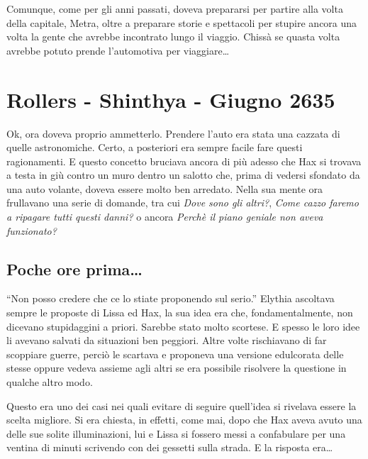     Comunque, come per gli anni passati, doveva prepararsi per partire alla
    volta della capitale, Metra, oltre a preparare storie e spettacoli per
    stupire ancora una volta la gente che avrebbe incontrato lungo il
    viaggio. Chissà se quasta volta avrebbe potuto prende l'automotiva per
    viaggiare\dots{}

    \section{Rollers - Shinthya - Giugno 2635}
    Ok, ora doveva proprio ammetterlo. Prendere l'auto era stata una
    cazzata di quelle astronomiche. Certo, a posteriori era sempre facile
    fare questi ragionamenti. E questo concetto bruciava ancora di più
    adesso che Hax si trovava a testa in giù contro un muro dentro un
    salotto che, prima di vedersi sfondato da una auto volante, doveva
    essere molto ben arredato. Nella sua mente ora frullavano una serie di
    domande, tra cui \emph{Dove sono gli altri?}, \emph{Come cazzo faremo
    a ripagare tutti questi danni?} o ancora \emph{Perchè il piano geniale
    non aveva funzionato?}

    \subsection{Poche ore prima\dots{}}
    ``Non posso credere che ce lo stiate proponendo sul serio.'' Elythia
    ascoltava sempre le proposte di Lissa ed Hax, la sua idea era che,
    fondamentalmente, non dicevano stupidaggini a priori. Sarebbe stato
    molto scortese. E spesso le loro idee li avevano salvati da situazioni
    ben peggiori. Altre volte rischiavano di far scoppiare guerre, perciò
    le scartava e proponeva una versione edulcorata delle stesse oppure
    vedeva assieme agli altri se era possibile risolvere la questione in
    qualche altro modo.

    Questo era uno dei casi nei quali evitare di seguire quell'idea si
    rivelava essere la scelta migliore. Si era chiesta, in effetti, come
    mai, dopo che Hax aveva avuto una delle sue solite illuminazioni, lui e
    Lissa si fossero messi a confabulare per una ventina di minuti
    scrivendo con dei gessetti sulla strada. E la risposta era\dots{}

